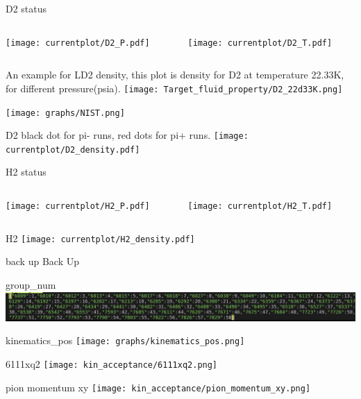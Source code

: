 \documentclass[aspectratio=169,xcolor=dvipsnames]{beamer}
\begin{document}
\begin{frame}{D2 status}
  \begin{columns}
    \begin{column}[T]{0.5\textwidth}
      \texttt{[image: currentplot/D2\_P.pdf]}
    \end{column}
    \begin{column}[T]{0.5\textwidth}
      \texttt{[image: currentplot/D2\_T.pdf]}
    \end{column}
\end{columns}
\end{frame}

\begin{frame}
  An example for LD2 density, this plot is density for D2 at temperature 22.33K, for different pressure(psia). 
  \texttt{[image: Target\_fluid\_property/D2\_22d33K.png]}

  \texttt{[image: graphs/NIST.png]}
\end{frame}

\begin{frame}{D2}
  black dot for pi- runs, red dots for pi+ runs. 
   \texttt{[image: currentplot/D2\_density.pdf]}
\end{frame}

\begin{frame}{H2 status}
  \begin{columns}
    \begin{column}[T]{0.5\textwidth}
      \texttt{[image: currentplot/H2\_P.pdf]}
    \end{column}
    \begin{column}[T]{0.5\textwidth}
      \texttt{[image: currentplot/H2\_T.pdf]}
    \end{column}
\end{columns}
\end{frame}

\begin{frame}{H2}
     \texttt{[image: currentplot/H2\_density.pdf]}
\end{frame}

\begin{frame}{back up}
    Back Up
\end{frame}
\begin{frame}{group_num}
    \includegraphics[width = \textwidth]{group_num.png}
\end{frame}

\begin{frame}{kinematics_pos}
  \texttt{[image: graphs/kinematics\_pos.png]}
\end{frame}

\begin{frame}{6111xq2}
  \texttt{[image: kin\_acceptance/6111xq2.png]}
\end{frame}

\begin{frame}{pion momentum xy}
  \texttt{[image: kin\_acceptance/pion\_momentum\_xy.png]}
\end{frame}
\end{document}
